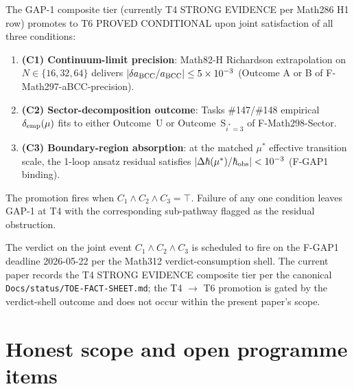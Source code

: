 \begin{theorem}
\label{thm:Math299}
The GAP-1 composite tier (currently T4 STRONG EVIDENCE per Math286
H1 row) promotes to T6 PROVED CONDITIONAL upon joint satisfaction
of all three conditions:
\begin{enumerate}
\item \textbf{(C1) Continuum-limit precision}: Math82-H Richardson
extrapolation on $N \in \{16, 32, 64\}$ delivers
$|\delta a_{\rm BCC}/a_{\rm BCC}| \le 5\times 10^{-3}$ (Outcome A
or B of F-Math297-aBCC-precision).
\item \textbf{(C2) Sector-decomposition outcome}: Tasks
\#147/\#148 empirical $\delta_{\rm emp}(\mu)$ fits to either
Outcome~U or Outcome~S$_{i^* = 3}$ of F-Math298-Sector.
\item \textbf{(C3) Boundary-region absorption}: at the matched
$\mu^*$ effective transition scale, the 1-loop ansatz residual
satisfies $|\Delta\hbar(\mu^*)/\hbar_{\rm obs}| < 10^{-3}$
(F-GAP1 binding).
\end{enumerate}
The promotion fires when $C_1 \wedge C_2 \wedge C_3 = \top$.
Failure of any one condition leaves GAP-1 at T4 with the
corresponding sub-pathway flagged as the residual obstruction.
\end{theorem}

\begin{remark}
\label{rem:verdict-shell}
The verdict on the joint event $C_1 \wedge C_2 \wedge C_3$ is
scheduled to fire on the F-GAP1 deadline 2026-05-22 per the
Math312 verdict-consumption shell. The current paper records the
T4 STRONG EVIDENCE composite tier per the canonical
\texttt{Docs/status/TOE-FACT-SHEET.md}; the T4 $\to$ T6
promotion is gated by the verdict-shell outcome and does not occur
within the present paper's scope.
\end{remark}

\section{Honest scope and open programme items}\label{sec:scope}

